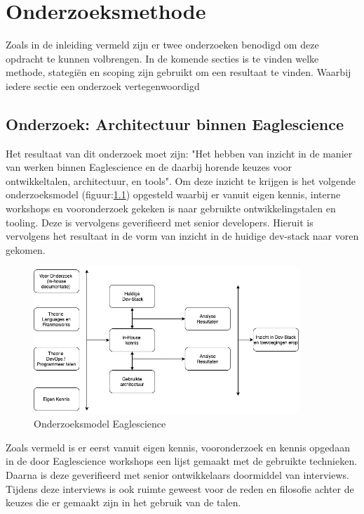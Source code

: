 
\chapter{Onderzoeksmethode}\label{ch:onderzoeksmethode} %

Zoals in de inleiding vermeld zijn er twee onderzoeken benodigd om deze opdracht te kunnen volbrengen.
In de komende secties is te vinden welke methode, stategiën en scoping zijn gebruikt om een resultaat te vinden.
Waarbij iedere sectie een onderzoek vertegenwoordigd


\section{Onderzoek: Architectuur binnen Eaglescience}\label{sec:onderzoeksmethode-architectuur-binnen-eaglescience}
Het resultaat van dit onderzoek moet zijn: "Het hebben van inzicht in de manier van werken binnen Eaglescience en de daarbij horende keuzes voor ontwikkeltalen, architectuur, en tools".
Om deze inzicht te krijgen is het volgende onderzoeksmodel (figuur:\ref{fig:Onderzoeks model Eaglescience}) opgesteld waarbij er vanuit eigen kennis, interne workshops en vooronderzoek gekeken is naar gebruikte ontwikkelingstalen en tooling.
Deze is vervolgens geverifieerd met senior developers.
Hieruit is vervolgens het resultaat in de vorm van inzicht in de huidige dev-stack naar voren gekomen.
\begin{figure}[h!] %
  \myfloatalign
  \includegraphics[width=10cm]{gfx/OnderzoeksmodelES}
  \caption{Onderzoeksmodel Eaglescience}
  \label{fig:Onderzoeks model Eaglescience}
\end{figure}

Zoals vermeld is er eerst vanuit eigen kennis, vooronderzoek en kennis opgedaan in de door Eaglescience workshops een lijst gemaakt met de gebruikte technieken.
Daarna is deze geverifieerd met senior ontwikkelaars doormiddel van interviews.
Tijdens deze interviews is ook ruimte geweest voor de reden en filosofie achter de keuzes die er gemaakt zijn in het gebruik van de talen.

